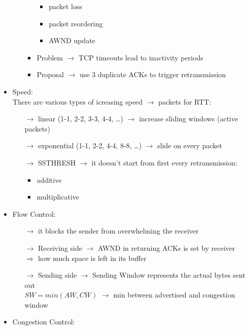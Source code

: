 \begin{itemize}
\begin{itemize}
\begin{itemize}
\begin{itemize}
                \item packet loss
                \item packet reordering
                \item AWND update
            \end{itemize}
            \item Problem $\rightarrow$ TCP timeouts lead to inactivity periods
            \item Proposal $\rightarrow$ use 3 duplicate ACKs to trigger retransmission
        \end{itemize}
    \end{itemize}
    \item Speed:\\[0.2cm]
    There are various types of icreasing speed $\rightarrow$ packets for RTT:
    \begin{itemize}
        \item[$\rightarrow$] linear (1-1, 2-2, 3-3, 4-4, \dots) $\rightarrow$ increase sliding windows (active packets)
        \item[$\rightarrow$] exponential (1-1, 2-2, 4-4, 8-8, \dots) $\rightarrow$ slide on every packet
        \item[$\rightarrow$] SSTHRESH $\rightarrow$ it doesn't start from first every retransmission:
        \begin{itemize}
            \item additive 
            \item multiplicative
        \end{itemize}
    \end{itemize}
    \item Flow Control:
    \begin{itemize}
        \item[$\rightarrow$] it blocks the sender from overwhelming the receiver
        \item[$\rightarrow$] Receiving side $\rightarrow$ AWND in returning ACKs is set by receiver\\
        $\Rightarrow$ how much space is left in its buffer
        \item[$\rightarrow$] Sending side $\rightarrow$ Sending Window represents the actual bytes sent out\\
        $SW = min(AW, CW)$ $\rightarrow$ min between advertised and congestion window
    \end{itemize}
    \item Congestion Control:
    \begin{itemize}

\end{itemize}
\end{itemize}
